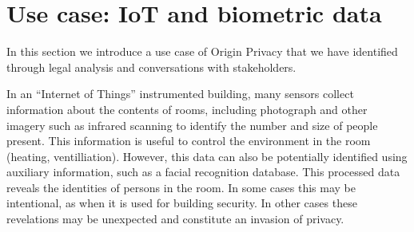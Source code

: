 \documentclass[../thesis.tex]{subfiles}
\begin{document}
%
%
%

%
%
%

\section{Use case: IoT and biometric data}
\label{sec:usecase}

In this section we introduce a use case of Origin Privacy that
we have identified through legal analysis and conversations
with stakeholders.

\begin{exm}
In an ``Internet of Things'' instrumented building, many sensors
collect information about the contents of rooms, including
photograph and other imagery such as infrared scanning
to identify the number and size of people
present. This information is useful to control the environment
in the room (heating, ventilliation). However, this data can
also be potentially identified using auxiliary information,
such as a facial recognition database.
This processed data reveals the identities of persons in
the room.
In some cases this may be intentional, as when it is used
for building security.
In other cases these revelations may be unexpected and constitute
an invasion of privacy.
\end{exm}
\end{document}
